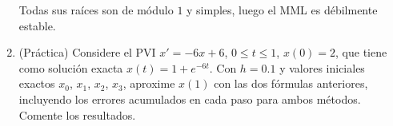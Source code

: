 \begin{ejercicio}
\begin{enumerate}
        Todas sus raíces son de módulo $1$ y simples, luego el MML es débilmente estable.
        \item (Práctica) Considere el PVI $x' = -6x + 6$, $0 \leq t \leq 1$, $x(0) = 2$, que tiene como solución exacta $x(t) = 1 + e^{-6t}$. Con $h = 0.1$ y valores iniciales exactos $x_0$, $x_1$, $x_2$, $x_3$, aproxime $x(1)$ con las dos fórmulas anteriores, incluyendo los errores acumulados en cada paso para ambos métodos. Comente los resultados.
    \end{enumerate}
\end{ejercicio}
